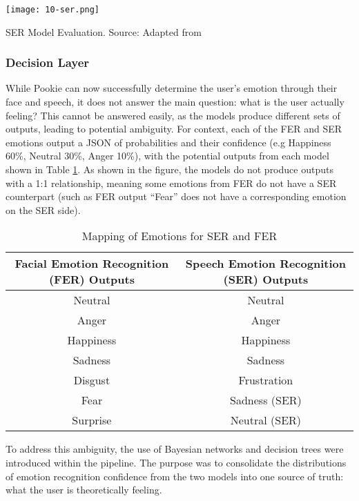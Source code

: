 \begin{table} [!ht]
    \centering
    \texttt{[image: 10-ser.png]}
    \captionsetup{justification=centering}
    \caption{SER Model Evaluation. Source: Adapted from \cite{vistec_ai_ser}}
    \label{tab:10-ser}
\end{table}

\subsubsection{Decision Layer}
While Pookie can now successfully determine the user’s emotion through their face and speech, it does not answer the main question: what is the user actually feeling? This cannot be answered easily, as the models produce different sets of outputs, leading to potential ambiguity. For context, each of the FER and SER emotions output a JSON of probabilities and their confidence (e.g Happiness 60\%, Neutral 30\%, Anger 10\%), with the potential outputs from each model shown in Table \ref{tab:11-mapping}. As shown in the figure, the models do not produce outputs with a 1:1 relationship, meaning some emotions from FER do not have a SER counterpart (such as FER output “Fear” does not have a corresponding emotion on the SER side).

\begin{table}[h]
    \centering
    \begin{tabular}{|c|c|}
        \hline
        \textbf{Facial Emotion Recognition (FER) Outputs} & \textbf{Speech Emotion Recognition (SER) Outputs} \\
        \hline
        Neutral   & Neutral   \\
        \hline
        Anger     & Anger     \\
        \hline
        Happiness & Happiness \\
        \hline
        Sadness   & Sadness   \\
        \hline
        Disgust   & Frustration \\
        \hline
        Fear      & Sadness (SER)   \\
        \hline
        Surprise  & Neutral (SER)   \\
        \hline
    \end{tabular}
    \caption{Mapping of Emotions for SER and FER}
    \label{tab:11-mapping}
\end{table}

To address this ambiguity, the use of Bayesian networks and decision trees were introduced within the pipeline. The purpose was to consolidate the distributions of emotion recognition confidence from the two models into one source of truth: what the user is theoretically feeling. 

